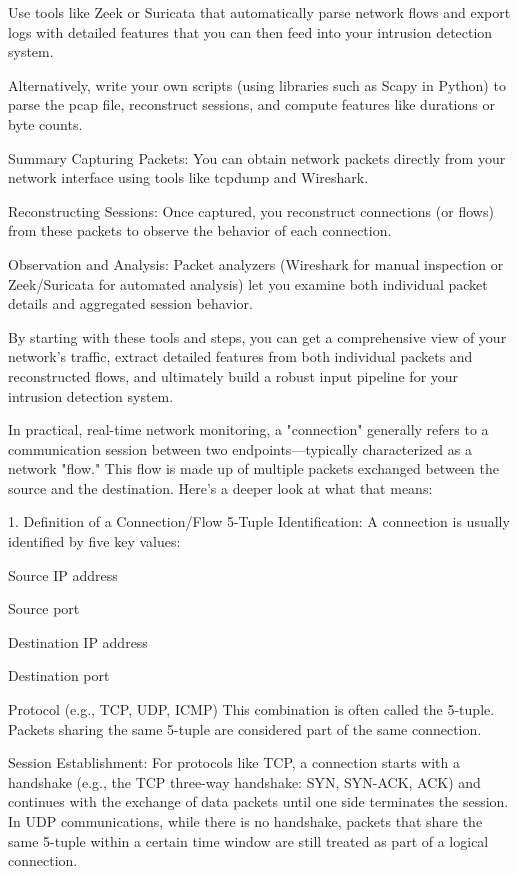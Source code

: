 \documentclass{article}
\begin{document}
Use tools like Zeek or Suricata that automatically parse network flows and export logs with detailed features that you can then feed into your intrusion detection system.

Alternatively, write your own scripts (using libraries such as Scapy in Python) to parse the pcap file, reconstruct sessions, and compute features like durations or byte counts.

Summary
Capturing Packets: You can obtain network packets directly from your network interface using tools like tcpdump and Wireshark.

Reconstructing Sessions: Once captured, you reconstruct connections (or flows) from these packets to observe the behavior of each connection.

Observation and Analysis: Packet analyzers (Wireshark for manual inspection or Zeek/Suricata for automated analysis) let you examine both individual packet details and aggregated session behavior.

By starting with these tools and steps, you can get a comprehensive view of your network's traffic, extract detailed features from both individual packets and reconstructed flows, and ultimately build a robust input pipeline for your intrusion detection system.

In practical, real-time network monitoring, a "connection" generally refers to a communication session between two endpoints—typically characterized as a network "flow." This flow is made up of multiple packets exchanged between the source and the destination. Here’s a deeper look at what that means:

1. Definition of a Connection/Flow
5-Tuple Identification:
A connection is usually identified by five key values:

Source IP address

Source port

Destination IP address

Destination port

Protocol (e.g., TCP, UDP, ICMP)
This combination is often called the 5-tuple. Packets sharing the same 5-tuple are considered part of the same connection.

Session Establishment:
For protocols like TCP, a connection starts with a handshake (e.g., the TCP three-way handshake: SYN, SYN-ACK, ACK) and continues with the exchange of data packets until one side terminates the session. In UDP communications, while there is no handshake, packets that share the same 5-tuple within a certain time window are still treated as part of a logical connection.
\end{document}
